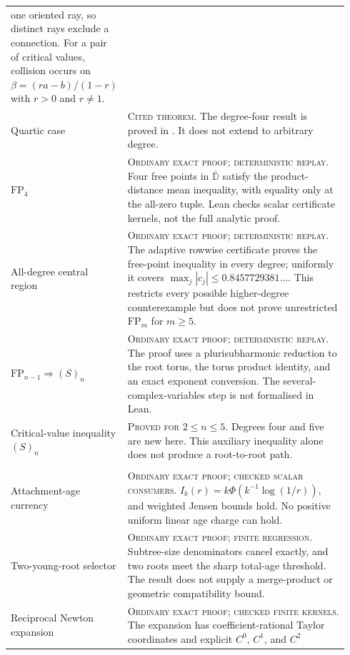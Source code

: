 \documentclass[11pt]{article}
\begin{document}
{\begin{longtable}{@{}
  >{\raggedright\arraybackslash}p{0.28\linewidth}
  >{\raggedright\arraybackslash}p{0.66\linewidth}@{}}
one oriented ray, so distinct rays exclude a connection.  For a pair of
critical values, collision occurs on
$\beta=(ra-b)/(1-r)$ with $r>0$ and $r\ne1$. \\
\addlinespace
Quartic case &
\textsc{Cited theorem.}  The degree-four result is proved in
\cite[Thm.~1, p.~1]{june2026}.  It does not extend to arbitrary degree. \\
\addlinespace
$\mathrm{FP}_4$ &
\textsc{Ordinary exact proof; deterministic replay.}  Four free points in
$\overline{\mathbb D}$ satisfy the product-distance mean inequality, with
equality only at the all-zero tuple.  Lean checks scalar certificate kernels,
not the full analytic proof. \\
\addlinespace
All-degree central region &
\textsc{Ordinary exact proof; deterministic replay.}  The adaptive rowwise
certificate proves the free-point inequality in every degree; uniformly it
covers $\max_j|c_j|\le0.8457729381\ldots$.  This restricts every possible
higher-degree counterexample but does not prove unrestricted
$\mathrm{FP}_m$ for $m\ge5$. \\
\addlinespace
$\mathrm{FP}_{n-1}\Rightarrow(S)_n$ &
\textsc{Ordinary exact proof; deterministic replay.}  The proof uses a
plurisubharmonic reduction to the root torus, the torus product identity, and
an exact exponent conversion.  The several-complex-variables step is not
formalised in Lean. \\
\addlinespace
Critical-value inequality $(S)_n$ &
\textsc{Proved for $2\le n\le5$.}  Degrees four and five are new here.  This
auxiliary inequality alone does not produce a root-to-root path. \\
\midrule
\multicolumn{2}{@{}p{0.94\linewidth}@{}}{\textbf{Attachment-time and local-transfer route}} \\
\addlinespace
Attachment-age currency &
\textsc{Ordinary exact proof; checked scalar consumers.}
$I_k(r)=k\Phi(k^{-1}\log(1/r))$, and weighted Jensen bounds hold.  No
positive uniform linear age charge can hold. \\
\addlinespace
Two-young-root selector &
\textsc{Ordinary exact proof; finite regression.}  Subtree-size denominators
cancel exactly, and two roots meet the sharp total-age threshold.  The result
does not supply a merge-product or geometric compatibility bound. \\
\addlinespace
Reciprocal Newton expansion &
\textsc{Ordinary exact proof; checked finite kernels.}  The expansion has
coefficient-rational Taylor coordinates and explicit $C^0$, $C^1$, and $C^2$

\end{longtable}}
\end{document}
